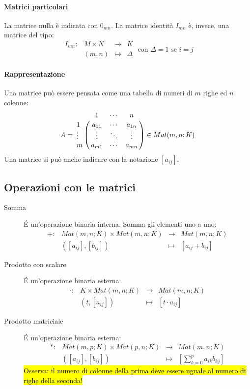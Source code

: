 \documentclass[a4paper,12pt,oneside]{article}
\begin{document}
\paragraph{Matrici particolari} La matrice nulla è indicata con $0_{mn}$. La
matrice identità $I_{mn}$ è, invece, una matrice del tipo:
\[
    \begin{array}{cccc}
        I_{mn}: & M \times N & \to & K \\
        & (m,n) & \mapsto & \Delta
    \end{array} \text{ con } \Delta{} = 1 \text{ se } i = j
\]

\paragraph{Rappresentazione} Una matrice può essere pensata come una tabella di
numeri di $m$ righe ed $n$ colonne:
\[
    A =
    \bordermatrix{~ & 1 & \cdots & n \cr
                  1 & a_{11} & \cdots & a_{1n} \cr
                  \vdots & \vdots & \ddots & \vdots \cr
                  m & a_{m1} & \cdots & a_{mn} \cr }
    \in Mat(m,n;K)
\]
Una matrice si può anche indicare con la notazione $[a_{ij}]$.

\subsection{Operazioni con le matrici}
\begin{description}
    \item[Somma] \'E un'operazione binaria interna. Somma gli elementi uno a uno:
        \[
            \begin{array}{cccc}
                +: & Mat(m,n;K) \times Mat(m,n;K) & \to &Mat(m,n;K) \\
                & ([a_{ij}], [b_{ij}]) &\mapsto  & [a_{ij} + b_{ij}]
            \end{array}
        \]
    \item[Prodotto con scalare] \'E un'operazione binaria esterna:
        \[
            \begin{array}{cccc}
                \cdot: & K \times Mat(m,n;K) & \to &Mat(m,n;K) \\
                & (t, [a_{ij}]) &\mapsto  & [t \cdot a_{ij}]
            \end{array}
        \]
    \item[Prodotto matriciale] \'E un'operazione binaria esterna:
        \[
            \begin{array}{cccc}
                \ast: & Mat(m,p;K) \times Mat(p,n;K) & \to &Mat(m,n;K) \\
                & ([a_{ij}], [b_{ij}]) &\mapsto  & [\sum_{k=0}^p a_{ik}b_{kj}]
            \end{array}
        \]
        \hl{Osserva: il numero di colonne della prima deve essere uguale al numero
            di righe della seconda!}
\end{description}
\end{document}
